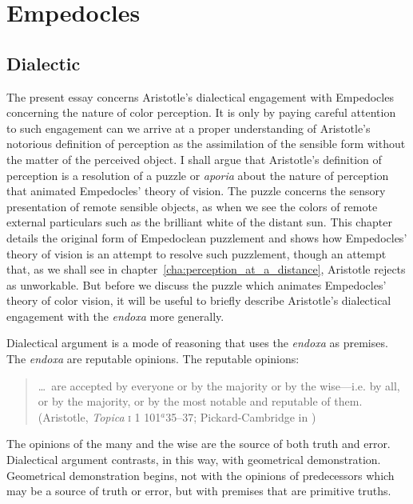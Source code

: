 \chapter{Empedocles} %
\label{cha:empedocles}

\section{Dialectic} %
\label{sec:dialectic}

The present essay concerns Aristotle's dialectical engagement with Empedocles concerning the nature of color perception. It is only by paying careful attention to such engagement can we arrive at a proper understanding of Aristotle's notorious definition of perception as the assimilation of the sensible form without the matter of the perceived object. I shall argue that Aristotle's definition of perception is a resolution of a puzzle or \emph{aporia} about the nature of perception that animated Empedocles' theory of vision. The puzzle concerns the sensory presentation of remote sensible objects, as when we see the colors of remote external particulars such as the brilliant white of the distant sun. This chapter details the original form of Empedoclean puzzlement and shows how Empedocles' theory of vision is an attempt to resolve such puzzlement, though an attempt that, as we shall see in chapter~\ref{cha:perception_at_a_distance}, Aristotle rejects as unworkable. But before we discuss the puzzle which animates Empedocles' theory of color vision, it will be useful to briefly describe Aristotle's dialectical engagement with the \emph{endoxa} more generally.

Dialectical argument is a mode of reasoning that uses the \emph{endoxa} as premises. The \emph{endoxa} are reputable opinions. The reputable opinions:
\begin{quote}
	\ldots\ are accepted by everyone or by the majority or by the wise---i.e. by all, or by the majority, or by the most notable and reputable of them. (Aristotle, \emph{Topica} \textsc{i} 1 101\( ^{a} \)35--37; Pickard-Cambridge in \citealt[2-3]{Barnes:1984uq})
\end{quote}
The opinions of the many and the wise are the source of both truth and error. Dialectical argument contrasts, in this way, with geometrical demonstration. Geometrical demonstration begins, not with the opinions of predecessors which may be a source of truth or error, but with premises that are primitive truths.

